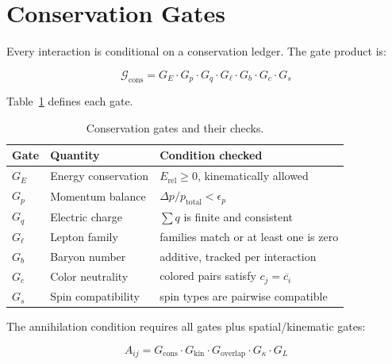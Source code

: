 \documentclass[11pt,a4paper]{article}
\theoremstyle{defbox}
\begin{document}
\section{Conservation Gates}
\label{sec:gates}

Every interaction is conditional on a conservation ledger.  The gate product
is:

\begin{equation}
  \mathcal{G}_{\mathrm{cons}}
  = G_E \cdot G_p \cdot G_q \cdot G_\ell \cdot G_b \cdot G_c \cdot G_s
\end{equation}

Table~\ref{tab:gates} defines each gate.

\begin{table}[ht]
\centering
\caption{Conservation gates and their checks.}
\label{tab:gates}
\renewcommand{\arraystretch}{1.25}
\begin{tabular}{lll}
\toprule
\textbf{Gate} & \textbf{Quantity} & \textbf{Condition checked} \\
\midrule
$G_E$      & Energy conservation   & $E_{\mathrm{rel}} \geq 0$, kinematically allowed \\
$G_p$      & Momentum balance      & $\Delta p / p_{\mathrm{total}} < \epsilon_p$ \\
$G_q$      & Electric charge       & $\sum q$ is finite and consistent \\
$G_\ell$   & Lepton family         & families match or at least one is zero \\
$G_b$      & Baryon number         & additive, tracked per interaction \\
$G_c$      & Color neutrality      & colored pairs satisfy $c_j = \overline{c_i}$ \\
$G_s$      & Spin compatibility    & spin types are pairwise compatible \\
\bottomrule
\end{tabular}
\end{table}

The annihilation condition requires all gates plus spatial/kinematic gates:

\begin{equation}
  \boxed{
	A_{ij} =
	  G_{\mathrm{cons}} \cdot G_{\mathrm{kin}} \cdot G_{\mathrm{overlap}}
	  \cdot G_\kappa \cdot G_L
  }
\end{equation}
\end{document}
